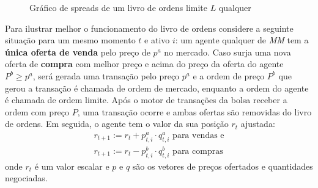 \begin{figure}[H]
	\begin{center}
	\end{center}
	\caption{Gráfico de spreads de um livro de ordens limite $L$ qualquer}
\end{figure}

Para ilustrar melhor o funcionamento do livro de ordens considere a seguinte situação para um mesmo momento $t$ e ativo $i$: um agente qualquer de \textit{MM} tem a \textbf{única oferta de venda} pelo preço de $p^{a}$ no mercado. Caso surja uma nova oferta de \textbf{compra} com melhor preço e acima do preço da oferta do agente $P^{b} \geq p^{a}$, será gerada uma transação pelo preço $p^{a}$ e a ordem de preço $P^{b}$ que gerou a transação é chamada de ordem de mercado, enquanto a ordem do agente é chamada de ordem limite. Após o motor de transações da bolsa receber a ordem com preço $P$, uma transação ocorre e ambas ofertas são removidas do livro de ordens. Em seguida, o agente tem o valor da sua posição $r_{t}$ ajustada:
\begin{equation}
    \begin{aligned}
    	r_{t + 1}:= r_{t} + p^{a}_{t, i} \cdot q^{a}_{t, i} \text{ para vendas e} \\ 
    	r_{t + 1}:= r_{t} - p^{b}_{t, i} \cdot q^{b}_{t, i} \text{ para compras}
    \end{aligned}
\end{equation}
onde $r_{t}$ é um valor escalar e $p$ e $q$ são os vetores de preços ofertados e quantidades negociadas.

